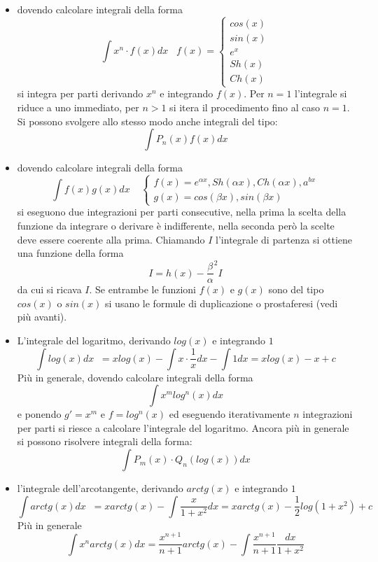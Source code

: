 \begin{itemize}
    \item dovendo calcolare integrali della forma
    \[
        \int x^n \cdot f(x) dx \;\;\; f(x) = \begin{cases}
            cos(x)\\ 
            sin(x)\\ 
            e^x\\ 
            Sh(x)\\ 
            Ch(x)        
        \end{cases}
    \]
    si integra per parti derivando $x^n$ e integrando $f(x)$. Per $n=1$ l'integrale si riduce a uno immediato, per $n>1$ si itera il procedimento fino al caso $n=1$. Si possono svolgere allo stesso modo anche integrali del tipo:
    \[
        \int P_n(x) f(x) dx
    \]
    \item dovendo calcolare integrali della forma
    \[
        \int f(x) g(x) dx \;\;\;\; \begin{cases}
            f(x) = e^{\alpha x}, Sh(\alpha x), Ch( \alpha x), a^{bx} \\
            g(x) = cos( \beta x), sin(\beta x)
        \end{cases}
    \]
    si eseguono due integrazioni per parti consecutive, nella prima la scelta della funzione da integrare o derivare è indifferente, nella seconda però la scelte deve essere coerente alla prima. Chiamando $I$ l'integrale di partenza si ottiene una funzione della forma
    \[
        I = h(x) - \frac{\beta}{\alpha}^2 I
    \]
    da cui si ricava $I$.\newline
    Se entrambe le funzioni $f(x)$ e $g(x)$ sono del tipo $cos(x)$ o $sin(x)$ si usano le formule di duplicazione o prostaferesi (vedi più avanti).
    \item L'integrale del logaritmo, derivando $log(x)$ e integrando $1$
    \[
        \int log(x) dx \;\; = xlog(x) - \int x \cdot  \frac{1}{x} dx - \int 1 dx = x log(x) -x + c
    \]
    Più in generale, dovendo calcolare integrali della forma
    \[
        \int x^m log^n(x) dx
    \]
    e ponendo $g' = x^m$ e $f = log^n(x)$ ed eseguendo iterativamente $n$ integrazioni per parti si riesce a calcolare l'integrale del logaritmo. Ancora più in generale si possono risolvere integrali della forma:
    \[
        \int P_m(x) \cdot Q_n(log(x)) dx 
    \]
    \item l'integrale dell'arcotangente, derivando $arctg(x)$ e integrando $1$
    \[
        \int arctg (x) dx \;\; = x arctg(x) -\int \frac{x}{1+x^2}dx = x arctg(x) -\frac{1}{2}log(1+x^2) + c 
    \]
    Più in generale
    \[
        \int x^n arctg(x) dx  = \frac{x^{n+1}}{n+1}arctg(x) - \int\frac{x^{n+1}}{n+1} \frac{dx}{1+x^2}
    \]
\end{itemize}
